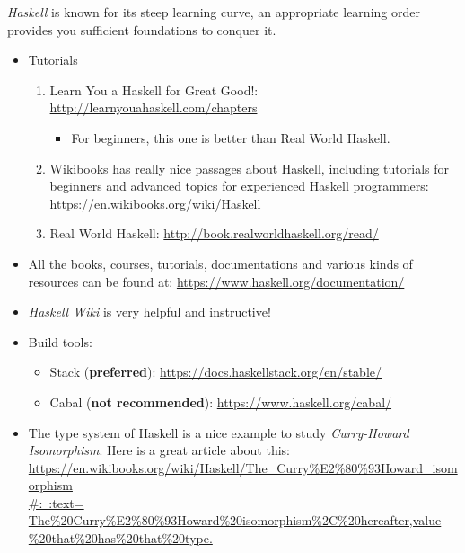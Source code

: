 \documentclass{article}
\begin{document}
\begin{itemize}
    \emph{Haskell} is known for its steep learning curve, an appropriate learning order provides you sufficient foundations to conquer it.
    \begin{itemize}
        \item Tutorials
        \begin{enumerate}
            \item Learn You a Haskell for Great Good!:
            \href{http://learnyouahaskell.com/chapters}{http://learnyouahaskell.com/chapters}
            \begin{itemize}
                \item For beginners, this one is better than Real World Haskell.
            \end{itemize}
            \item Wikibooks has really nice passages about Haskell, including tutorials for beginners and advanced topics for experienced Haskell programmers:\\
            \href{https://en.wikibooks.org/wiki/Haskell}{https://en.wikibooks.org/wiki/Haskell}
            \item Real World Haskell:
            \href{http://book.realworldhaskell.org/read/}{http://book.realworldhaskell.org/read/}
        \end{enumerate}
        \item All the books, courses, tutorials, documentations and various kinds of resources can be found at:
        \href{https://www.haskell.org/documentation/}{https://www.haskell.org/documentation/}
        \item \emph{Haskell Wiki} is very helpful and instructive!
        \item Build tools:
        \begin{itemize}
            \item Stack (\textbf{preferred}):
            \href{https://docs.haskellstack.org/en/stable/}{https://docs.haskellstack.org/en/stable/}
            \item Cabal (\textbf{not recommended}):
            \href{https://www.haskell.org/cabal/}{https://www.haskell.org/cabal/}
            
        \end{itemize}
        \item The type system of Haskell is a nice example to study \emph{Curry-Howard Isomorphism}. Here is a great article about this:\\
        \href{https://en.wikibooks.org/wiki/Haskell/The_Curry%E2%80%93Howard_isomorphism#:~:text=The%20Curry%E2%80%93Howard%20isomorphism%2C%20hereafter,value%20that%20has%20that%20type.}{https://en.wikibooks.org/wiki/Haskell/The\_Curry\%E2\%80\%93Howard\_isomorphism\\
        #:~:text=  The\%20Curry\%E2\%80\%93Howard\%20isomorphism\%2C\%20hereafter,value\\
        \%20that\%20has\%20that\%20type.}
        

\end{itemize}
\end{itemize}
\end{document}

